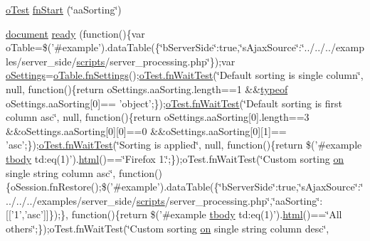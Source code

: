 \begin{DoxyCompactItemize}
\item 
\hyperlink{unit__test_8js_a3b2d259e2df3b6860d9047a92d09d0d6}{o\+Test} \hyperlink{4__server-side_2aa_sorting_8js_ab688a84f629c151d4d7cb4f6cc9c19ea}{fn\+Start} (\char`\"{}aa\+Sorting\char`\"{})
\item 
\hyperlink{outside_events_8js_aa14f8e0338cced6720590fd2ea13bd4b}{document} \hyperlink{4__server-side_2aa_sorting_8js_a6cb61c245bdfeab708f2012f68b9a8dd}{ready} (function()\{var o\+Table=\$('\#example').data\+Table(\{\char`\"{}b\+Server\+Side\char`\"{}\+:true,\char`\"{}s\+Ajax\+Source\char`\"{}\+:\char`\"{}../../../examples/server\+\_\+side/\hyperlink{tinymce_8jquery_8dev_8js_a09066d4d580eeec222f858d588b4cdef}{scripts}/server\+\_\+processing.\+php\char`\"{}\});var \hyperlink{model_8settings_8js_a4857b9c813b4dea010668e9555d0aca7}{o\+Settings}=\hyperlink{api_8methods_8js_a78f387fab92a85c2cb7830bc5d8a6141}{o\+Table.\+fn\+Settings}();\hyperlink{onhold_24__server-side_2__zero__config_8js_ab25c4d596771c0133cdc45178ce72c3d}{o\+Test.\+fn\+Wait\+Test}(\char`\"{}Default sorting is single column\char`\"{}, null, function()\{return o\+Settings.\+aa\+Sorting.\+length==1 \&\&\hyperlink{extras_2_scroller_2media_2docs_2media_2js_2sh_brush_j_script_8js_a93a9266f92d6d68644e7aa63da3caa11}{typeof} o\+Settings.\+aa\+Sorting\mbox{[}0\mbox{]}== 'object';\});\hyperlink{onhold_24__server-side_2__zero__config_8js_ab25c4d596771c0133cdc45178ce72c3d}{o\+Test.\+fn\+Wait\+Test}(\char`\"{}Default sorting is first column asc\char`\"{}, null, function()\{return o\+Settings.\+aa\+Sorting\mbox{[}0\mbox{]}.length==3 \&\&o\+Settings.\+aa\+Sorting\mbox{[}0\mbox{]}\mbox{[}0\mbox{]}==0 \&\&o\+Settings.\+aa\+Sorting\mbox{[}0\mbox{]}\mbox{[}1\mbox{]}== 'asc';\});\hyperlink{onhold_24__server-side_2__zero__config_8js_ab25c4d596771c0133cdc45178ce72c3d}{o\+Test.\+fn\+Wait\+Test}(\char`\"{}Sorting is applied\char`\"{}, null, function()\{return \$('\#example \hyperlink{core_8constructor_8js_a99b0542c7c50fe8757c55bf9dac5f3be}{tbody} td\+:eq(1)').\hyperlink{tinymce_8jquery_8dev_8js_ac2090bcf2ff968c0083d5de53a6544f3}{html}()==\char`\"{}Firefox 1.\char`\"{};\});o\+Test.\+fn\+Wait\+Test(\char`\"{}Custom sorting \hyperlink{fullpage_2plugin_8min_8js_a1cfa98b7fed2aaf9fee3b68dbb7f9497}{on} single string column asc\char`\"{}, function()\{o\+Session.\+fn\+Restore();\$('\#example').data\+Table(\{\char`\"{}b\+Server\+Side\char`\"{}\+:true,\char`\"{}s\+Ajax\+Source\char`\"{}\+:\char`\"{}../../../examples/server\+\_\+side/\hyperlink{tinymce_8jquery_8dev_8js_a09066d4d580eeec222f858d588b4cdef}{scripts}/server\+\_\+processing.\+php\char`\"{},\char`\"{}aa\+Sorting\char`\"{}\+:\mbox{[}\mbox{[}'1','asc'\mbox{]}\mbox{]}\});\}, function()\{return \$('\#example \hyperlink{core_8constructor_8js_a99b0542c7c50fe8757c55bf9dac5f3be}{tbody} td\+:eq(1)').\hyperlink{tinymce_8jquery_8dev_8js_ac2090bcf2ff968c0083d5de53a6544f3}{html}()==\char`\"{}All others\char`\"{};\});o\+Test.\+fn\+Wait\+Test(\char`\"{}Custom sorting \hyperlink{fullpage_2plugin_8min_8js_a1cfa98b7fed2aaf9fee3b68dbb7f9497}{on} single string column desc\char`\"{}, 
\end{DoxyCompactItemize}
